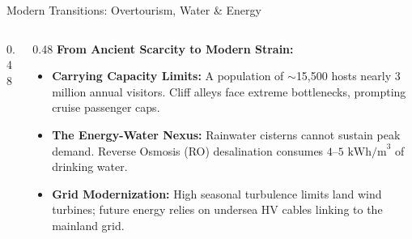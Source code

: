 \begin{frame}[label=challenges]{Modern Transitions: Overtourism, Water \& Energy}
  \begin{columns}[T, onlytextwidth]
    \begin{column}{0.48\textwidth}
    \end{column}

    \begin{column}{0.48\textwidth}
      \textbf{\color{aegeanblue}From Ancient Scarcity to Modern Strain:}
      \vspace{0.15em}
      \begin{itemize}
          \setlength{\itemsep}{0.15em}
        \item \textbf{Carrying Capacity Limits:} A population of $\sim$15,500 hosts nearly 3 million annual visitors. Cliff alleys face extreme bottlenecks, prompting cruise passenger caps.
        \item \textbf{The Energy-Water Nexus:} Rainwater cisterns cannot sustain peak demand. Reverse Osmosis (RO) desalination consumes $4\text{--}5\text{ kWh/m}^3$ of drinking water.
        \item \textbf{Grid Modernization:} High seasonal turbulence limits land wind turbines; future energy relies on undersea HV cables linking to the mainland grid.
      \end{itemize}
    \end{column}
  \end{columns}
\end{frame}
